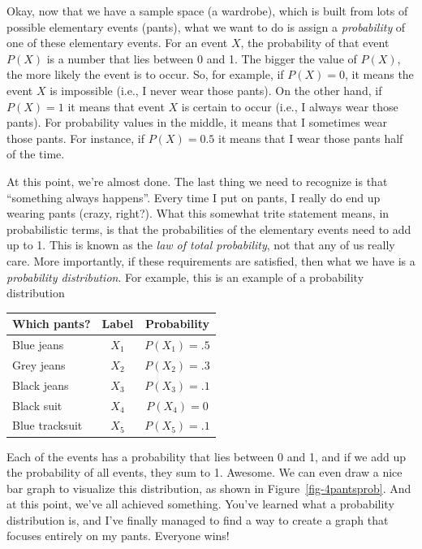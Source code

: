 \documentclass[
  letterpaper,
  DIV=11,
  numbers=noendperiod]{scrreprt}
\begin{document}
Okay, now that we have a sample space (a wardrobe), which is built from
lots of possible elementary events (pants), what we want to do is assign
a \emph{probability} of one of these elementary events. For an event
\(X\), the probability of that event \(P(X)\) is a number that lies
between 0 and 1. The bigger the value of \(P(X)\), the more likely the
event is to occur. So, for example, if \(P(X) = 0\), it means the event
\(X\) is impossible (i.e., I never wear those pants). On the other hand,
if \(P(X) = 1\) it means that event \(X\) is certain to occur (i.e., I
always wear those pants). For probability values in the middle, it means
that I sometimes wear those pants. For instance, if \(P(X) = 0.5\) it
means that I wear those pants half of the time.

At this point, we're almost done. The last thing we need to recognize is
that ``something always happens''. Every time I put on pants, I really
do end up wearing pants (crazy, right?). What this somewhat trite
statement means, in probabilistic terms, is that the probabilities of
the elementary events need to add up to 1. This is known as the
\emph{law of total probability}, not that any of us really care. More
importantly, if these requirements are satisfied, then what we have is a
\emph{probability distribution}. For example, this is an example of a
probability distribution

\begin{longtable}[]{@{}lcc@{}}
\toprule\noalign{}
Which pants? & Label & Probability \\
\midrule\noalign{}
\endhead
\bottomrule\noalign{}
\endlastfoot
Blue jeans & \(X_1\) & \(P(X_1) = .5\) \\
Grey jeans & \(X_2\) & \(P(X_2) = .3\) \\
Black jeans & \(X_3\) & \(P(X_3) = .1\) \\
Black suit & \(X_4\) & \(P(X_4) = 0\) \\
Blue tracksuit & \(X_5\) & \(P(X_5) = .1\) \\
\end{longtable}

Each of the events has a probability that lies between 0 and 1, and if
we add up the probability of all events, they sum to 1. Awesome. We can
even draw a nice bar graph to visualize this distribution, as shown in
Figure~\ref{fig-4pantsprob}. And at this point, we've all achieved
something. You've learned what a probability distribution is, and I've
finally managed to find a way to create a graph that focuses entirely on
my pants. Everyone wins!
\end{document}
